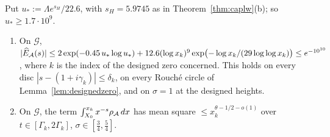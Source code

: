 \begin{lemma}\label{lem:ZA}
Put $u_*:=\Lambda e^{s_H}/22.6$, with $s_H=5.9745$ as in Theorem~\ref{thm:caplw}(b); so $u_*\ge1.7\cdot10^9$.
\begin{enumerate}[label=(\alph*)]
\item On $\mathcal G$,
$|\widehat E_{\mathcal{A}}(s)|\le2\exp(-0.45\,u_*\log u_*)+12.6(\log x_k)^9\exp\bigl(-\log x_k/(29\log\log x_k)\bigr)\le e^{-10^{10}}$,
where $k$ is the index of the designed zero concerned. This holds on every disc
$|s-(1+i\gamma_k)|\le\delta_k$, on every Rouch\'e circle of Lemma~\ref{lem:designedzero}, and on $\sigma=1$ at the designed heights.
\item On $\mathcal G$, the term $\int_{X_0}^{x_k}x^{-s}\rho_{\mathcal{A}}\,dx$ has mean square $\le x_k^{\theta-1/2-o(1)}$ over
$t\in[\Gamma_k,2\Gamma_k]$, $\sigma\in[\tfrac34,\tfrac54]$.
\end{enumerate}
\end{lemma}
